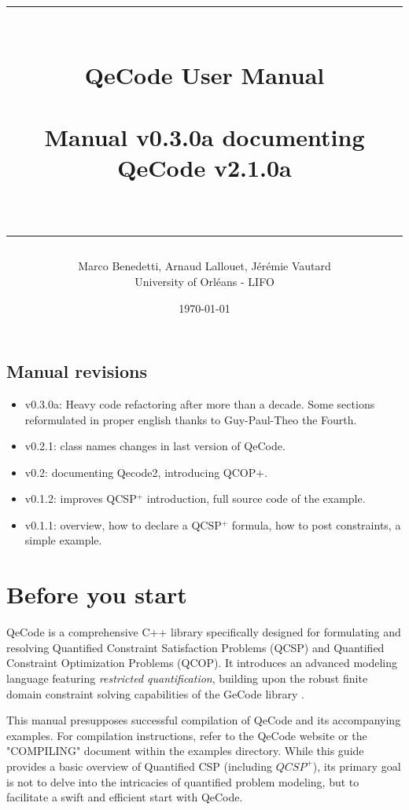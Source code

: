 \documentclass{article}
\begin{document}
\title{\vspace*{5cm}\hrule~\\ QeCode User Manual\\~\\
\small Manual v0.3.0a documenting QeCode v2.1.0a\\~\hrule} %
\author{Marco Benedetti, Arnaud Lallouet, J\'er\'emie Vautard\vspace*{2mm}\\ 
University of Orl\'eans - LIFO\vspace*{2mm}}
\date{\small\today}
\maketitle
\thispagestyle{empty}
\subsection*{Manual revisions}
\begin{itemize}
\item v0.3.0a: Heavy code refactoring after more than a decade. Some sections reformulated in proper english thanks to Guy-Paul-Theo the Fourth. 
\item v0.2.1: class names changes in last version of QeCode.
\item v0.2: documenting Qecode2, introducing QCOP+.
\item v0.1.2: improves QCSP$^+$ introduction, full source code of the example.
\item v0.1.1: overview, how to declare a QCSP$^+$ formula, how to post constraints, a simple example.
\end{itemize}
\newpage

\section{Before you start}
QeCode is a comprehensive C++ library specifically designed for formulating and resolving Quantified Constraint Satisfaction Problems (QCSP) and Quantified Constraint Optimization Problems (QCOP). It introduces an advanced modeling language featuring {\em restricted quantification}, building upon the robust finite domain constraint solving capabilities of the GeCode library \cite{gecode}.

This manual presupposes successful compilation of QeCode and its accompanying examples. For compilation instructions, refer to the QeCode website or the "COMPILING" document within the examples directory. While this guide provides a basic overview of Quantified CSP (including $QCSP^+$), its primary goal is not to delve into the intricacies of quantified problem modeling, but to facilitate a swift and efficient start with QeCode.
\end{document}
